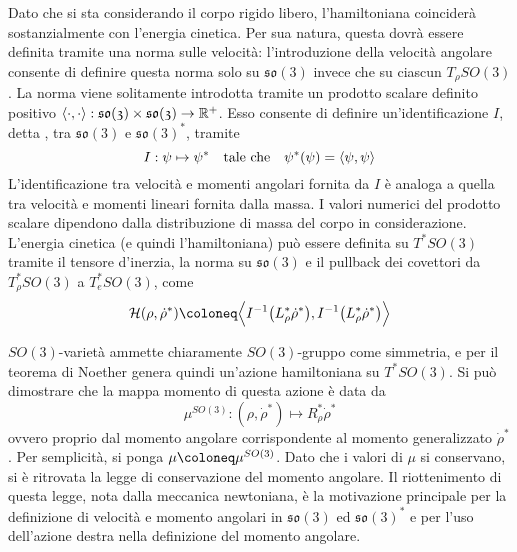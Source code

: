 Dato che si sta considerando il corpo rigido libero, l'hamiltoniana coinciderà sostanzialmente con l'energia cinetica. Per sua natura, questa dovrà essere definita tramite una norma sulle velocità: l'introduzione della velocità angolare consente di definire questa norma solo su $\mathfrak{so(3)}$ invece che su ciascun $T_{\rho}SO(3)$. La norma viene solitamente introdotta tramite un prodotto scalare definito positivo $\langle \cdot, \cdot\rangle: \mathfrak{so(3)} \times  \mathfrak{so(3)} \to \mathbb{R}^+$. Esso consente di definire un'identificazione $I$, detta , tra $\mathfrak{so(3)}$ e $\mathfrak{so(3)}^*$, tramite
\begin{equation}
I: \psi \mapsto \psi^* \qqtext{tale che} \psi^* (\psi) = \langle \psi, \psi \rangle
\end{equation} 
L'identificazione tra velocità e momenti angolari fornita da $I$ è analoga a quella tra velocità e momenti lineari fornita dalla massa. I valori numerici del prodotto scalare dipendono dalla distribuzione di massa del corpo in considerazione. L'energia cinetica (e quindi l'hamiltoniana) può essere definita su $T^* SO(3)$ tramite il tensore d'inerzia, la norma su $\mathfrak{so(3)}$ e il pullback dei covettori da $T^*_{\rho}SO(3)$ a $T^*_{e}SO(3)$, come
\begin{equation}
\mathcal{H}(\rho, \dot{\rho}^*) \defeq \Big\langle I^{-1}\big(L^*_\rho \dot{\rho}^*\big), I^{-1}\big(L^*_\rho \dot{\rho}^*\big) \Big\rangle
\end{equation}

$SO(3)$-varietà ammette chiaramente $SO(3)$-gruppo come simmetria, e per il teorema di Noether genera quindi un'azione hamiltoniana su $T^*SO(3)$. Si può dimostrare che la mappa momento di questa azione è data da 
\begin{equation}
\mu^{SO(3)}: (\rho, \dot{\rho}^*) \longmapsto R_{\rho}^* \dot{\rho}^* 
\end{equation}
ovvero proprio dal momento angolare corrispondente al momento generalizzato $\dot{\rho}^*$. Per semplicità, si ponga $\mu \defeq \mu^{SO(3)}$. Dato che i valori di $\mu$ si conservano, si è ritrovata la legge di conservazione del momento angolare. Il riottenimento di questa legge, nota dalla meccanica newtoniana, è la motivazione principale per la definizione di velocità e momento angolari in $\mathfrak{so(3)}$ ed $\mathfrak{so(3)}^*$ e per l'uso dell'azione destra nella definizione del momento angolare.

